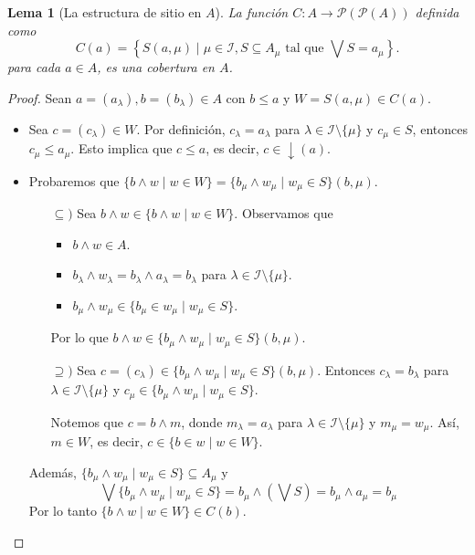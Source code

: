 \documentclass[12pt,letterpaper,titlepage]{article}
\newtheorem*{lemma}{Lema}
\theoremstyle{definition}
\newcommand\Sup{\bigvee}
\newcommand\down{{\downarrow}}
\renewcommand\inf{\wedge}
\renewcommand\cal[1]{\mathcal{#1}}
\newcommand\scr[1]{\mathscr{#1}}
\newcommand\<{\langle}
\renewcommand\>{\rangle}
\begin{document}
\begin{lemma}[La estructura de sitio en $A$]
    La función $C:A\to\cal P(\cal P(A))$
    definida como
    \[
        C(a)
        =\left\{ S(a,\mu)
        \mid \mu\in\scr I, S\subseteq A_\mu
        \text{ tal que }\Sup S=a_\mu\right \}.
    \]
    para cada $a\in A$, es una cobertura en $A$.
\end{lemma}
\begin{proof}
    Sean $a=(a_\lambda),b=(b_\lambda)\in A$ con $b\leq a$ y $W=S(a,\mu)\in C(a)$.
    \begin{itemize}
    \item Sea $c=(c_\lambda)\in W$. Por definición, $c_\lambda=a_\lambda$ para $\lambda\in \scr I\setminus\{\mu\}$ y $c_\mu \in S$, entonces $c_\mu\leq a_\mu$. Esto implica que $c\leq a$, es decir, $c\in \down(a)$.
    \end{itemize}
    
    \begin{itemize}
    \item Probaremos que $\{b\inf w\mid w\in W\}=\{b_\mu \inf w_\mu\mid w_\mu\in S\}(b,\mu)$.\par 
    \begin{itemize}
    \item[$\subseteq)$] Sea $b\inf w\in\{b\inf w\mid w\in W\}$. Observamos que 
    \begin{itemize}
    \item $b\inf w\in A$.
    \item $b_\lambda\inf w_\lambda=b_\lambda\inf a_\lambda=b_\lambda$ para $\lambda\in\scr I\setminus \{\mu\}$.
    \item $b_\mu\inf w_\mu\in\{b_\mu\in w_\mu\mid w_\mu\in S\}$.
    \end{itemize}
    Por lo que $b\inf w\in \{b_\mu \inf w_\mu\mid w_\mu\in S\}(b,\mu)$.
    \item[$\supseteq)$] Sea $c=(c_\lambda) \in \{b_\mu \inf w_\mu\mid w_\mu\in S\}(b,\mu)$. Entonces $c_\lambda=b_\lambda$ para $\lambda\in\scr I\setminus\{\mu\}$ y $c_\mu\in \{b_\mu \inf w_\mu\mid w_\mu\in S\}$.\par 
    Notemos que $c=b\inf m$, donde $m_\lambda=a_\lambda$ para $\lambda\in\scr I\setminus \{\mu\}$ y $m_\mu=w_\mu$. Así, $m\in W$, es decir, $c\in\{b\in w\mid w\in W\}$.
    \end{itemize}
    Además, $\{b_\mu \inf w_\mu\mid w_\mu\in S\}\subseteq A_\mu$ y
    \[\Sup\{b_\mu \inf w_\mu\mid w_\mu\in S\}=b_\mu\inf \left(\Sup S\right)=b_\mu\inf a_\mu=b_\mu\]
    Por lo tanto $\{b\inf w\mid w\in W\}\in C(b)$.
    \end{itemize}
\end{proof}
\end{document}
